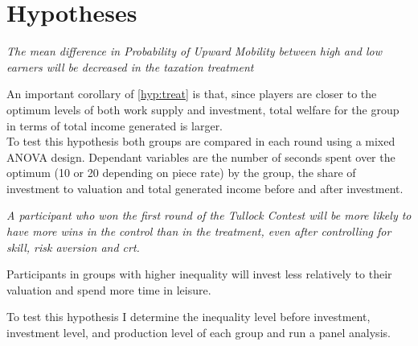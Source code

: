    \section{Hypotheses}\label{ss:hyp}
    
     \begin{hyp} \label{hyp:treat}\textit{The mean difference in Probability of Upward Mobility between high and low earners will be decreased in the taxation treatment}\end{hyp}
     
     
     
      
      An important corollary of \cref{hyp:treat} is that, since players are closer to the optimum levels of both work supply and investment, total welfare for the group in terms of total income generated is larger.\\
      
        To test this hypothesis both groups are compared in each round using a mixed ANOVA design. Dependant variables are the number of seconds spent over the optimum (10 or 20 depending on piece rate) by the group, the share of investment to valuation and total generated income before and after investment.
        
    
    \begin{hyp}\label{hyp:wins}
    \textit{A participant who won the first round of the Tullock Contest will be more likely to have more wins in the control than in the treatment, even after controlling for skill, risk aversion and crt.}
    \end{hyp}    
    
    
    \begin{hyp}\label{hyp:a} Participants in groups with higher inequality will invest less relatively to their valuation and spend more time in leisure.\end{hyp}
    
    To test this hypothesis I determine the inequality level before investment, investment level, and production level of each group and run a panel analysis.
    
    
    
